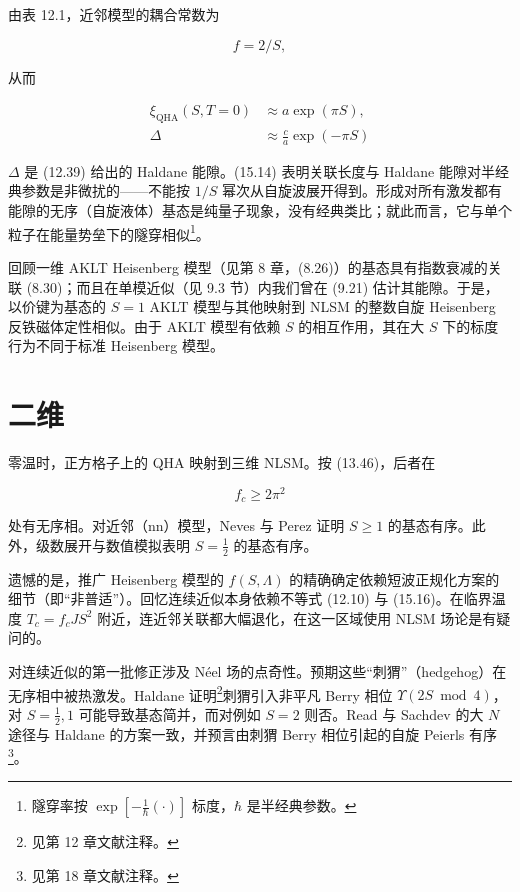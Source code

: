 由表 12.1，近邻模型的耦合常数为

\begin{equation*}
f = 2 / S ,
\tag{15.13}
\end{equation*}

从而

\begin{align*}
\xi_{\mathrm{QHA}} ( S, T = 0 ) & \approx a \exp ( \pi S ) ,\\
\Delta & \approx \frac {c}{a} \exp ( - \pi S )
\tag{15.14}
\end{align*}

$\Delta$ 是 (12.39) 给出的 Haldane 能隙。(15.14) 表明关联长度与 Haldane 能隙对半经典参数是非微扰的——不能按 $1/S$ 幂次从自旋波展开得到。形成对所有激发都有能隙的无序（自旋液体）基态是纯量子现象，没有经典类比；就此而言，它与单个粒子在能量势垒下的隧穿相似\footnote{隧穿率按 $\exp\left[-\frac{1}{\hbar}(\cdot)\right]$ 标度，$\hbar$ 是半经典参数。}。

回顾一维 AKLT Heisenberg 模型（见第 8 章，(8.26)）的基态具有指数衰减的关联 (8.30)；而且在单模近似（见 9.3 节）内我们曾在 (9.21) 估计其能隙。于是，以价键为基态的 $S = 1$ AKLT 模型与其他映射到 NLSM 的整数自旋 Heisenberg 反铁磁体定性相似。由于 AKLT 模型有依赖 $S$ 的相互作用，其在大 $S$ 下的标度行为不同于标准 Heisenberg 模型。

\section{二维}

零温时，正方格子上的 QHA 映射到三维 NLSM。按 (13.46)，后者在

\begin{equation*}
f _ {c} \geq 2 \pi^ {2}
\tag{15.15}
\end{equation*}

处有无序相。对近邻（nn）模型，Neves 与 Perez 证明 $S \geq 1$ 的基态有序。此外，级数展开与数值模拟表明 $S = \frac{1}{2}$ 的基态有序。

遗憾的是，推广 Heisenberg 模型的 $f(S,\Lambda)$ 的精确确定依赖短波正规化方案的细节（即“非普适”）。回忆连续近似本身依赖不等式 (12.10) 与 (15.16)。在临界温度 $T_{c} = f_{c}JS^{2}$ 附近，连近邻关联都大幅退化，在这一区域使用 NLSM 场论是有疑问的。

对连续近似的第一批修正涉及 Néel 场的点奇性。预期这些“刺猬”（hedgehog）在无序相中被热激发。Haldane 证明\footnote{见第 12 章文献注释。}刺猬引入非平凡 Berry 相位 $\Upsilon(2S \bmod 4)$，对 $S=\frac{1}{2},1$ 可能导致基态简并，而对例如 $S=2$ 则否。Read 与 Sachdev 的大 $N$ 途径与 Haldane 的方案一致，并预言由刺猬 Berry 相位引起的自旋 Peierls 有序\footnote{见第 18 章文献注释。}。

